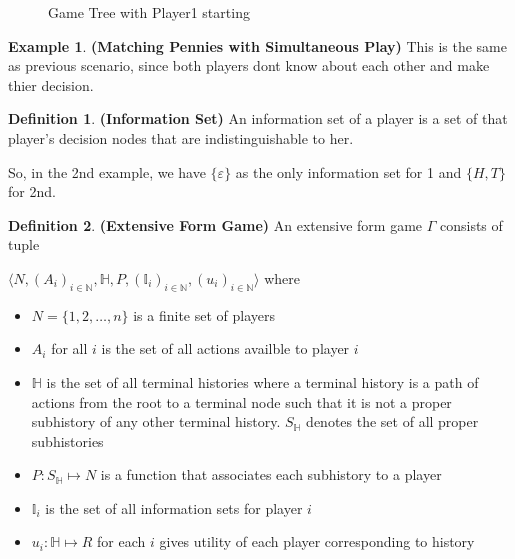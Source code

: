 \documentclass{article}
\theoremstyle{definition}
\newtheorem{defn}{Definition}[section]
\newtheorem{example}{Example}[section]
\begin{document}
\begin{figure}[H]\hspace*{\fill}%
\hspace*{\fill}%
\caption{Game Tree with Player1 starting}
\end{figure}
\begin{example}
\textbf{(Matching Pennies with Simultaneous Play)} This is the same as previous scenario, since both players dont know about each other and make thier decision.
\end{example}
\begin{defn}
\textbf{(Information Set)} An information set of a player is a set of that player’s decision nodes that are indistinguishable to her. 
\end{defn}
So, in the 2nd example, we have $\{\varepsilon\}$ as the only information set for 1 and $\{H,T\}$ for 2nd.
\begin{defn}
\textbf{(Extensive Form Game)} An extensive form game $\Gamma$ consists of tuple

$\langle N, (A_i)_{i\in\mathbb{N}}, \mathbb{H}, P, (\mathbb{I}_i)_{i\in\mathbb{N}}, (u_i)_{i\in\mathbb{N}}\rangle$ where
\begin{itemize}
	\item $N=\{1,2,\dots,n\}$ is a finite set of players
	\item $A_i$ for all $i$ is the set of all actions availble to player $i$
	\item $\mathbb{H}$ is the set of all terminal histories where a terminal history is a path of actions from the root to a terminal node such that it is not a proper subhistory of any other terminal history. $S_{\mathbb{H}}$ denotes the set of all proper subhistories
	\item $P: S_{\mathbb{H}} \mapsto N$ is a function that associates each subhistory to a player
	\item $\mathbb{I}_i$ is the set of all information sets for player $i$
	\item $u_i : \mathbb{H} \mapsto R$ for each $i$ gives utility of each player corresponding to history
\end{itemize}
\end{defn}
\end{document}
